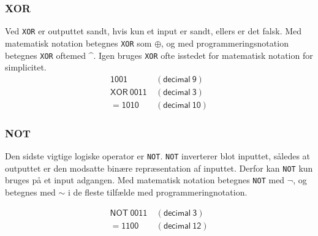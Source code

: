 \documentclass[12pt]{article}
\begin{document}
\subsubsection{XOR}
Ved \verb|XOR| er outputtet sandt, hvis kun et input er sandt, ellers er det falsk. Med matematisk notation betegnes \verb|XOR| som \(\oplus\), og med programmeringsnotation betegnes \verb|XOR| ofte\footnotemark[1] med \textasciicircum. Igen bruges \verb|XOR| ofte isstedet for matematisk notation for simplicitet.  
\begin{equation}
\begin{split}
\mathsf{     1001}& \ \mathsf{(decimal\ 9 ) } \\
\mathsf{XOR\ 0011}& \ \mathsf{(decimal\ 3 ) } \\
\mathsf{   = 1010}& \ \mathsf{(decimal\ 10) }
\end{split}
\end{equation}


\subsubsection{NOT}
Den sidste vigtige logiske operator er \verb|NOT|. \verb|NOT| inverterer blot inputtet, således at outputtet er den modsatte binære repræsentation af inputtet. Derfor kan \verb|NOT| kun bruges på et input adgangen. Med matematisk notation betegnes \verb|NOT| med \(\neg\), og betegnes med $\sim$ i de fleste tilfælde med programmeringnotation\footnotemark[1].

\begin{equation}
\begin{split}
\mathsf{NOT\ 0011}& \mathsf{\ (decimal\ 3 ) } \\
\mathsf{   = 1100}& \mathsf{\ (decimal\ 12) }
\end{split}
\end{equation}
\end{document}

